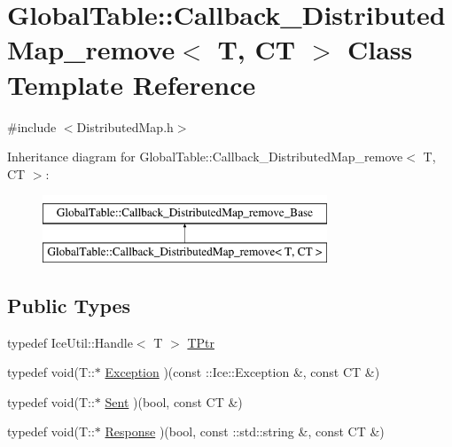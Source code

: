 \hypertarget{class_global_table_1_1_callback___distributed_map__remove}{
\section{GlobalTable::Callback\_\-DistributedMap\_\-remove$<$ T, CT $>$ Class Template Reference}
\label{class_global_table_1_1_callback___distributed_map__remove}
}


{\ttfamily \#include $<$DistributedMap.h$>$}

Inheritance diagram for GlobalTable::Callback\_\-DistributedMap\_\-remove$<$ T, CT $>$:\begin{figure}[H]
\begin{center}
\leavevmode
\includegraphics[height=2cm]{class_global_table_1_1_callback___distributed_map__remove}
\end{center}
\end{figure}
\subsection*{Public Types}
\begin{DoxyCompactItemize}
\item 
typedef IceUtil::Handle$<$ T $>$ \hyperlink{class_global_table_1_1_callback___distributed_map__remove_a4b1ddb2d17252cf60a112c6f5cf47cba}{TPtr}
\item 
typedef void(T::$\ast$ \hyperlink{class_global_table_1_1_callback___distributed_map__remove_a41f61bd2c451c6b36b1180b0a728d1a9}{Exception} )(const ::Ice::Exception \&, const CT \&)
\item 
typedef void(T::$\ast$ \hyperlink{class_global_table_1_1_callback___distributed_map__remove_a4f807ae9e10f4f3fe1b7f7f677bb5379}{Sent} )(bool, const CT \&)
\item 
typedef void(T::$\ast$ \hyperlink{class_global_table_1_1_callback___distributed_map__remove_a688f2491241f9e271cd69a42337257ee}{Response} )(bool, const ::std::string \&, const CT \&)
\end{DoxyCompactItemize}
